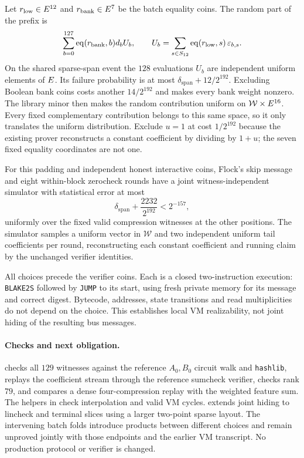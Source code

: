 Let $r_{\rm low}\in E^{12}$ and $r_{\rm bank}\in E^7$ be the batch equality coins. The random part of the prefix is
\[
 \sum_{b=0}^{127}\operatorname{eq}(r_{\rm bank},b)d_bU_b,
 \qquad
 U_b=\sum_{s\in S_{12}}\operatorname{eq}(r_{\rm low},s)\,\varepsilon_{b,s}.
\]
On the shared sparse-span event the $128$ evaluations $U_b$ are independent uniform elements of $E$. Its failure probability is at most $\delta_{\mathrm{span}}+12/2^{192}$. Excluding Boolean bank coins costs another $14/2^{192}$ and makes every bank weight nonzero. The library minor then makes the random contribution uniform on $\mathcal W\times E^{16}$. Every fixed complementary contribution belongs to this same space, so it only translates the uniform distribution. Exclude $u=1$ at cost $1/2^{192}$ because the existing prover reconstructs a constant coefficient by dividing by $1+u$; the seven fixed equality coordinates are not one.

\begin{theorem}
For this padding and independent honest interactive coins, Flock's skip message and eight within-block zerocheck rounds have a joint witness-independent simulator with statistical error at most
\[
 \delta_{\mathrm{span}}+\frac{2232}{2^{192}}<2^{-157},
\]
uniformly over the fixed valid compression witnesses at the other positions. The simulator samples a uniform vector in $\mathcal W$ and two independent uniform tail coefficients per round, reconstructing each constant coefficient and running claim by the unchanged verifier identities.
\end{theorem}

All choices precede the verifier coins. Each is a closed two-instruction execution: \texttt{BLAKE2S} followed by \texttt{JUMP} to its start, using fresh private memory for its message and correct digest. Bytecode, addresses, state transitions and read multiplicities do not depend on the choice. This establishes local VM realizability, not joint hiding of the resulting bus messages.

\paragraph{Checks and next obligation.}  checks all $129$ witnesses against the reference $A_0,B_0$ circuit walk and \texttt{hashlib}, replays the coefficient stream through the reference sumcheck verifier, checks rank $79$, and compares a dense four-compression replay with the weighted feature sum. The helpers in  check interpolation and valid VM cycles.  extends joint hiding to lincheck and terminal slices using a larger two-point sparse layout. The intervening batch folds introduce products between different choices and remain unproved jointly with those endpoints and the earlier VM transcript. No production protocol or verifier is changed.

